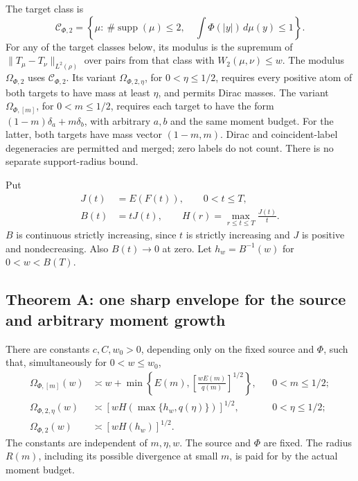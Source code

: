 The target class is
\[
 \mathcal C_{\Phi,2}
 =\left\{\mu:\ \#\operatorname{supp}(\mu)\le2,\quad
       \int\Phi(|y|)\,d\mu(y)\le1\right\}.
\]
For any of the target classes below, its modulus is the supremum of
\(\|T_\mu-T_\nu\|_{L^2(\rho)}\) over pairs from that class with \(W_2(\mu,\nu)\le w\).
The modulus \(\Omega_{\Phi,2}\) uses \(\mathcal C_{\Phi,2}\).
Its variant \(\Omega_{\Phi,2,\eta}\), for \(0<\eta\le1/2\), requires every positive atom of both targets to have mass at least \(\eta\), and permits Dirac masses.
The variant \(\Omega_{\Phi,[m]}\), for \(0<m\le1/2\), requires each target to have the form \((1-m)\delta_a+m\delta_b\), with arbitrary \(a,b\) and the same moment budget. For the latter, both targets have mass vector \((1-m,m)\). Dirac and coincident-label degeneracies are permitted and merged; zero labels do not count. There is no separate support-radius bound.

Put
\begin{equation}
 \begin{aligned}
 J(t)&=E(F(t)),\qquad 0<t\le T,\\
 B(t)&=tJ(t),\qquad H(r)=\max_{r\le t\le T}\frac{J(t)}t.
 \end{aligned}
 \tag{1.2}\label{eq:gm-envelope-functions}
\end{equation}
\(B\) is continuous strictly increasing, since \(t\) is strictly increasing and \(J\) is positive and nondecreasing. Also \(B(t)\to0\) at zero. Let \(h_w=B^{-1}(w)\) for \(0<w<B(T)\).

\subsection*{Theorem A: one sharp envelope for the source and arbitrary moment growth}

There are constants \(c,C,w_0>0\), depending only on the fixed source and \(\Phi\), such that, simultaneously for \(0<w\le w_0\),
\begin{align}
 \Omega_{\Phi,[m]}(w)
 &\asymp w+\min\left\{E(m),\left[\frac{wE(m)}{q(m)}\right]^{1/2}\right\},
 &&0<m\le1/2;
 \tag{1.3}\label{eq:gm-fixed-mass}\\
 \Omega_{\Phi,2,\eta}(w)
 &\asymp\left[wH\!\left(\max\{h_w,q(\eta)\}\right)\right]^{1/2},
 &&0<\eta\le1/2;
 \tag{1.4}\label{eq:gm-mass-floor}\\
 \Omega_{\Phi,2}(w)&\asymp[wH(h_w)]^{1/2}.
 &&\tag{1.5}\label{eq:gm-main}
\end{align}
The constants are independent of \(m,\eta,w\). The source and \(\Phi\) are fixed. The radius \(R(m)\), including its possible divergence at small \(m\), is paid for by the actual moment budget.

